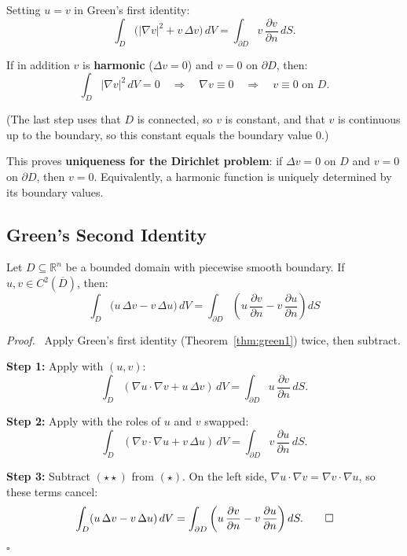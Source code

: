 \documentclass[11pt]{report}
\renewenvironment{proof}[1][Proof]{\par\noindent\textit{#1.}\ }{\hfill$\square$\par\medskip}
\newcommand{\R}{\mathbb{R}}
\begin{document}
\begin{remark}[Special Case: $u = v$]
Setting $u = v$ in Green's first identity:
\[
\int_D \big( |\nabla v|^2 + v \, \Delta v \big) \, dV = \int_{\partial D} v \, \frac{\partial v}{\partial n} \, dS.
\]

If in addition $v$ is \textbf{harmonic} ($\Delta v = 0$) and $v = 0$ on $\partial D$, then:
\[
\int_D |\nabla v|^2 \, dV = 0 \quad \Longrightarrow \quad \nabla v \equiv 0 \quad \Longrightarrow \quad v \equiv 0 \text{ on } D.
\]

(The last step uses that $D$ is connected, so $v$ is constant, and that $v$ is continuous up to the boundary, so this constant equals the boundary value $0$.)

This proves \textbf{uniqueness for the Dirichlet problem}: if $\Delta v = 0$ on $D$ and $v = 0$ on $\partial D$, then $v = 0$. Equivalently, a harmonic function is uniquely determined by its boundary values.
\end{remark}

\subsection*{Green's Second Identity}

\begin{theorem}
\label{thm:green2}
Let $D \subseteq \R^n$ be a bounded domain with piecewise smooth boundary. If $u, v \in C^2(\overline{D})$, then:
\[
\boxed{\int_D \big( u \, \Delta v - v \, \Delta u \big) \, dV = \int_{\partial D} \left( u \, \frac{\partial v}{\partial n} - v \, \frac{\partial u}{\partial n} \right) dS}
\]
\end{theorem}

\begin{proof}
Apply Green's first identity (Theorem~\ref{thm:green1}) twice, then subtract.

\textbf{Step 1:} Apply with $(u, v)$:
\[
\int_D (\nabla u \cdot \nabla v + u \, \Delta v) \, dV = \int_{\partial D} u \, \frac{\partial v}{\partial n} \, dS. \tag{$\star$}
\]

\textbf{Step 2:} Apply with the roles of $u$ and $v$ swapped:
\[
\int_D (\nabla v \cdot \nabla u + v \, \Delta u) \, dV = \int_{\partial D} v \, \frac{\partial u}{\partial n} \, dS. \tag{$\star\star$}
\]

\textbf{Step 3:} Subtract $(\star\star)$ from $(\star)$. On the left side, $\nabla u \cdot \nabla v = \nabla v \cdot \nabla u$, so these terms cancel:
\[
\int_D (u \, \Delta v - v \, \Delta u) \, dV = \int_{\partial D} \left( u \, \frac{\partial v}{\partial n} - v \, \frac{\partial u}{\partial n} \right) dS. \qedhere
\]
\end{proof}
\end{document}
